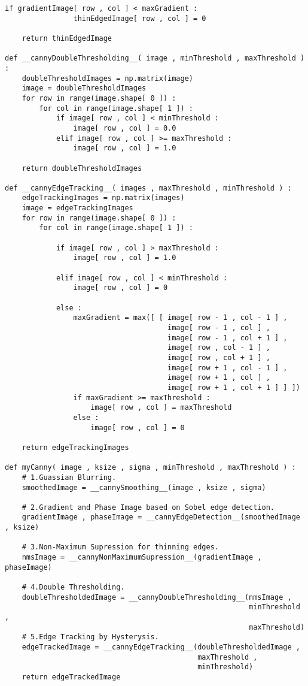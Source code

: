 \begin{lstlisting}[caption=Python implementation details for Canny Edge detection,label=imp:canny-all]
            if gradientImage[ row , col ] < maxGradient :
                thinEdgedImage[ row , col ] = 0

    return thinEdgedImage

def __cannyDoubleThresholding__( image , minThreshold , maxThreshold ) :
    doubleThresholdImages = np.matrix(image)
    image = doubleThresholdImages
    for row in range(image.shape[ 0 ]) :
        for col in range(image.shape[ 1 ]) :
            if image[ row , col ] < minThreshold :
                image[ row , col ] = 0.0
            elif image[ row , col ] >= maxThreshold :
                image[ row , col ] = 1.0

    return doubleThresholdImages

def __cannyEdgeTracking__( images , maxThreshold , minThreshold ) :
    edgeTrackingImages = np.matrix(images)
    image = edgeTrackingImages
    for row in range(image.shape[ 0 ]) :
        for col in range(image.shape[ 1 ]) :

            if image[ row , col ] > maxThreshold :
                image[ row , col ] = 1.0

            elif image[ row , col ] < minThreshold :
                image[ row , col ] = 0

            else :
                maxGradient = max([ [ image[ row - 1 , col - 1 ] ,
                                      image[ row - 1 , col ] ,
                                      image[ row - 1 , col + 1 ] ,
                                      image[ row , col - 1 ] ,
                                      image[ row , col + 1 ] ,
                                      image[ row + 1 , col - 1 ] ,
                                      image[ row + 1 , col ] ,
                                      image[ row + 1 , col + 1 ] ] ])
                if maxGradient >= maxThreshold :
                    image[ row , col ] = maxThreshold
                else :
                    image[ row , col ] = 0

    return edgeTrackingImages

def myCanny( image , ksize , sigma , minThreshold , maxThreshold ) :
    # 1.Guassian Blurring.
    smoothedImage = __cannySmoothing__(image , ksize , sigma)

    # 2.Gradient and Phase Image based on Sobel edge detection.
    gradientImage , phaseImage = __cannyEdgeDetection__(smoothedImage , ksize)

    # 3.Non-Maximum Supression for thinning edges.
    nmsImage = __cannyNonMaximumSupression__(gradientImage , phaseImage)

    # 4.Double Thresholding.
    doubleThresholdedImage = __cannyDoubleThresholding__(nmsImage ,
                                                         minThreshold ,
                                                         maxThreshold)
    # 5.Edge Tracking by Hysterysis.
    edgeTrackedImage = __cannyEdgeTracking__(doubleThresholdedImage ,
                                             maxThreshold ,
                                             minThreshold)
    return edgeTrackedImage
\end{lstlisting}
